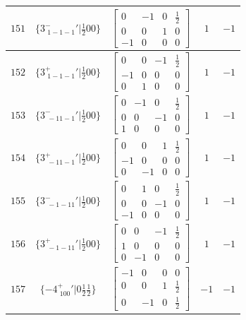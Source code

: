 \documentclass[fleqn,8pt]{jsarticle}
\begin{document}
\begin{longtable}{ccccc}
$ 151 $ & $ \{3^{-}_{\,\,1-1-1}{}'|\frac{1}{2} 0 0\} $ & $ \begin{bmatrix} 0 & -1 & 0 & \frac{1}{2} \\ 0 & 0 & 1 & 0 \\ -1 & 0 & 0 & 0 \end{bmatrix} $ & $ 1 $ & $ -1 $ \\ \hline
$ 152 $ & $ \{3^{+}_{\,\,1-1-1}{}'|\frac{1}{2} 0 0\} $ & $ \begin{bmatrix} 0 & 0 & -1 & \frac{1}{2} \\ -1 & 0 & 0 & 0 \\ 0 & 1 & 0 & 0 \end{bmatrix} $ & $ 1 $ & $ -1 $ \\ \hline
$ 153 $ & $ \{3^{-}_{\,\,-11-1}{}'|\frac{1}{2} 0 0\} $ & $ \begin{bmatrix} 0 & -1 & 0 & \frac{1}{2} \\ 0 & 0 & -1 & 0 \\ 1 & 0 & 0 & 0 \end{bmatrix} $ & $ 1 $ & $ -1 $ \\ \hline
$ 154 $ & $ \{3^{+}_{\,\,-11-1}{}'|\frac{1}{2} 0 0\} $ & $ \begin{bmatrix} 0 & 0 & 1 & \frac{1}{2} \\ -1 & 0 & 0 & 0 \\ 0 & -1 & 0 & 0 \end{bmatrix} $ & $ 1 $ & $ -1 $ \\ \hline
$ 155 $ & $ \{3^{-}_{\,\,-1-11}{}'|\frac{1}{2} 0 0\} $ & $ \begin{bmatrix} 0 & 1 & 0 & \frac{1}{2} \\ 0 & 0 & -1 & 0 \\ -1 & 0 & 0 & 0 \end{bmatrix} $ & $ 1 $ & $ -1 $ \\ \hline
$ 156 $ & $ \{3^{+}_{\,\,-1-11}{}'|\frac{1}{2} 0 0\} $ & $ \begin{bmatrix} 0 & 0 & -1 & \frac{1}{2} \\ 1 & 0 & 0 & 0 \\ 0 & -1 & 0 & 0 \end{bmatrix} $ & $ 1 $ & $ -1 $ \\ \hline
$ 157 $ & $ \{-4^{+}_{\,\,100}{}'|0 \frac{1}{2} \frac{1}{2}\} $ & $ \begin{bmatrix} -1 & 0 & 0 & 0 \\ 0 & 0 & 1 & \frac{1}{2} \\ 0 & -1 & 0 & \frac{1}{2} \end{bmatrix} $ & $ -1 $ & $ -1 $ \\ \hline

\end{longtable}
\end{document}
